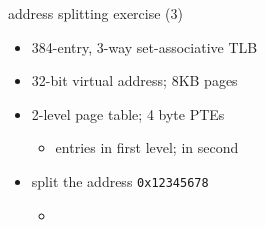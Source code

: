 \begin{frame}{address splitting exercise (3)}
\begin{itemize}
\item 384-entry, 3-way set-associative TLB
\item 32-bit virtual address; 8KB pages
\item 2-level page table; 4 byte PTEs
    \begin{itemize}
    \item {} entries in first level;  in second
    \end{itemize}
\item split the address {\tt 0x12345678}
    \begin{itemize}
    \item<2-> {\tt {}}
    \iftoggle{heldback}{}{
    \item<3-> 13-bit page offset \myemph<3>{\tt 1 0110 0111 1000}
    \item<4-> $32-13=19$-bit VPN \myemph<4>{\tt 0001 0010 0011 0100 010}
    \item<5-> 8-bit first part of VPN \myemph<5>{\tt 0001 0010}
    \item<6-> 11-bit second part of VPN \myemph<6>{\tt 0011 0100 010}
    \item<7-> 7-bit TLB index \myemph<7>{0100 010}
    \item<8-> $19-7=12$-bit TLB tag \myemph<8>{0001 0010 0011}
    }
    \end{itemize}
\end{itemize}
\end{frame}
